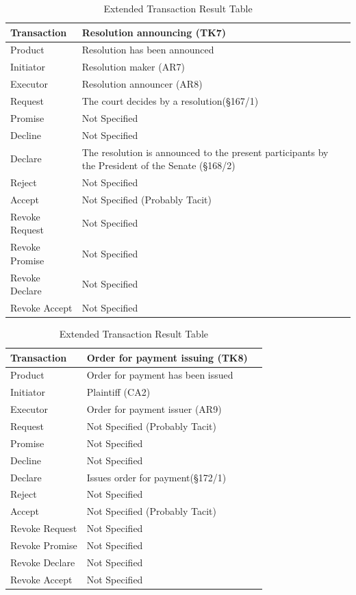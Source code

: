 \begin{landscape}
\begin{table}[h]
\caption{Extended Transaction Result Table}
\label{tab:etrt}
\begin{tabular}{|l||l|l|}
\hline
Transaction  &  Resolution announcing (TK7) \\ \hline
Product      &   Resolution has been announced \\ \hline
Initiator      &  Resolution maker (AR7) \\ \hline
Executor       &  Resolution announcer (AR8) \\ \hline
Request        &  The court decides by a resolution(\S167/1)  \\ \hline
Promise        &  Not Specified   \\ \hline
Decline        &  Not Specified   \\ \hline
Declare        &  The resolution is announced to the present participants by the President of the Senate (\S168/2)  \\ \hline
Reject         &  Not Specified   \\ \hline
Accept         & Not Specified (Probably Tacit) \\ \hline
Revoke Request & Not Specified       \\ \hline
Revoke Promise & Not Specified  \\ \hline
Revoke Declare & Not Specified      \\ \hline
Revoke Accept  &  Not Specified \\ \hline
\end{tabular}
\end{table}

\begin{table}[h]
\caption{Extended Transaction Result Table}
\label{tab:etrt}
\begin{tabular}{|l||l|l|}
\hline
Transaction  &  Order for payment issuing (TK8) \\ \hline
Product      &  Order for payment has been issued \\ \hline
Initiator      &  Plaintiff (CA2) \\ \hline
Executor       &  Order for payment issuer (AR9) \\ \hline
Request        &   Not Specified (Probably Tacit)  \\ \hline
Promise        &    Not Specified   \\ \hline
Decline        &  Not Specified   \\ \hline
Declare        &  Issues order for payment(\S172/1)  \\ \hline
Reject         &  Not Specified   \\ \hline
Accept         & Not Specified (Probably Tacit) \\ \hline
Revoke Request & Not Specified       \\ \hline
Revoke Promise & Not Specified  \\ \hline
Revoke Declare & Not Specified      \\ \hline
Revoke Accept  &  Not Specified \\ \hline
\end{tabular}
\end{table}


\end{landscape}
